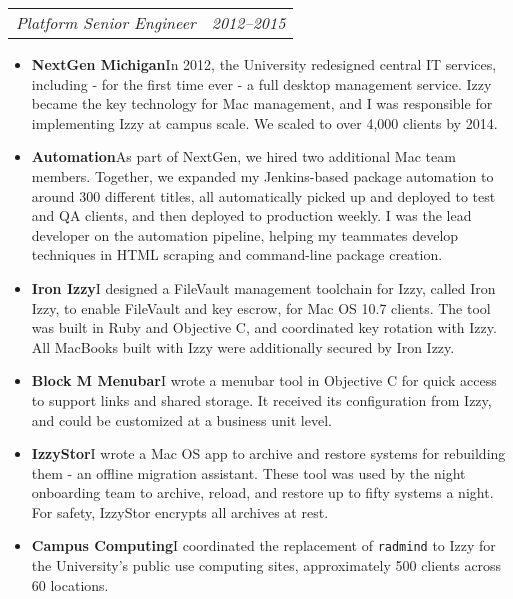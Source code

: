\documentclass[letterpaper,10pt]{article}
\makeatletter
\newcommand{\resumeItem}[2]{
  \item\small{
    \textbf{#1}{\hspace{0.6em}#2}
  }
}
\newcommand{\resumeSubSubheading}[2]{
    \begin{tabular*}{0.97\textwidth}[t]{l@{\extracolsep{\fill}}r}
      \textit{\small #1} & \textit{\small #2} \\
    \end{tabular*}%
}
\newcommand{\resumeItemListStart}{\begin{itemize}}
\newcommand{\resumeItemListEnd}{\end{itemize}}
\makeatother
\begin{document}
      \resumeSubSubheading
        {Platform Senior Engineer}{2012--2015}
        \resumeItemListStart
          \resumeItem{NextGen Michigan}
            {In 2012, the University redesigned central IT services, including - for the first time ever - a full desktop management service. Izzy became the key technology for Mac management, and I was responsible for implementing Izzy at campus scale. We scaled to over 4,000 clients by 2014.}

          \resumeItem{Automation}
            {As part of NextGen, we hired two additional Mac team members. Together, we expanded my Jenkins-based package automation to around 300 different titles, all automatically picked up and deployed to test and QA clients, and then deployed to production weekly. I was the lead developer on the automation pipeline, helping my teammates develop techniques in HTML scraping and command-line package creation.}

          \resumeItem{Iron Izzy}
            {I designed a FileVault management toolchain for Izzy, called Iron Izzy, to enable FileVault and key escrow, for Mac OS 10.7 clients. The tool was built in Ruby and Objective C, and coordinated key rotation with Izzy. All MacBooks built with Izzy were additionally secured by Iron Izzy.}

          \resumeItem{Block M Menubar}
            {I wrote a menubar tool in Objective C for quick access to support links and shared storage. It received its configuration from Izzy, and could be customized at a business unit level.}

          \resumeItem{IzzyStor}
            {I wrote a Mac OS app to archive and restore systems for rebuilding them - an offline migration assistant. These tool was used by the night onboarding team to archive, reload, and restore up to fifty systems a night. For safety, IzzyStor encrypts all archives at rest.}

          \resumeItem{Campus Computing}
            {I coordinated the replacement of \texttt{radmind} to Izzy for the University's public use computing sites, approximately 500 clients across 60 locations.}
        \resumeItemListEnd

\end{document}
